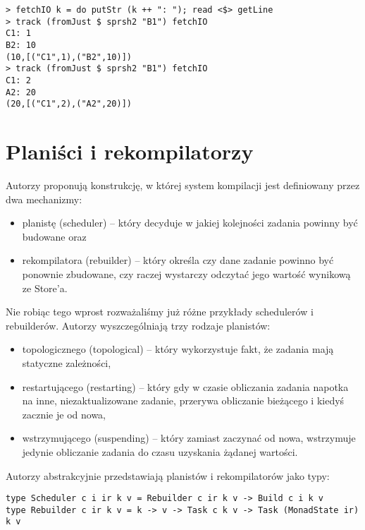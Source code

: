 \begin{lstlisting}
> fetchIO k = do putStr (k ++ ": "); read <$> getLine
> track (fromJust $ sprsh2 "B1") fetchIO
C1: 1
B2: 10
(10,[("C1",1),("B2",10)])
> track (fromJust $ sprsh2 "B1") fetchIO
C1: 2
A2: 20
(20,[("C1",2),("A2",20)])

\end{lstlisting}

\section{Planiści i rekompilatorzy}

Autorzy proponują konstrukcję, w której system kompilacji jest definiowany przez dwa mechanizmy:
\begin{itemize}
\item planistę (scheduler) -- który decyduje w jakiej kolejności zadania powinny być budowane oraz
\item rekompilatora (rebuilder) -- który określa czy dane zadanie powinno być ponownie zbudowane, czy raczej wystarczy odczytać jego wartość wynikową ze Store'a.
\end{itemize}

Nie robiąc tego wprost rozważaliśmy już różne przykłady schedulerów i rebuilderów. Autorzy wyszczególniają trzy rodzaje planistów:

\begin{itemize}
\item topologicznego (topological) -- który wykorzystuje fakt, że zadania mają statyczne zależności,
\item restartującego (restarting) -- który gdy w czasie obliczania zadania napotka na inne, niezaktualizowane zadanie, przerywa obliczanie bieżącego i kiedyś zacznie je od nowa,
\item wstrzymującego (suspending) -- który zamiast zaczynać od nowa, wstrzymuje jedynie obliczanie zadania do czasu uzyskania żądanej wartości.
\end{itemize}

Autorzy abstrakcyjnie przedstawiają planistów i rekompilatorów jako typy:

\begin{lstlisting}
type Scheduler c i ir k v = Rebuilder c ir k v -> Build c i k v
type Rebuilder c ir k v = k -> v -> Task c k v -> Task (MonadState ir) k v
\end{lstlisting}

